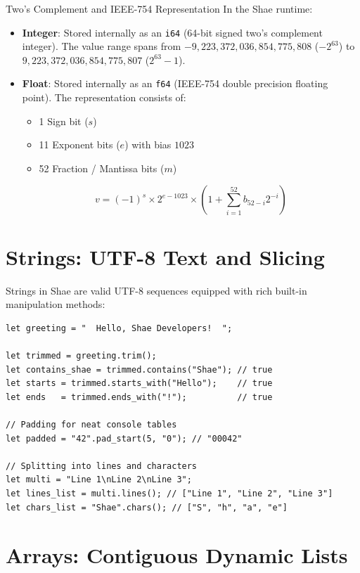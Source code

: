 \begin{deepbox}{Two's Complement and IEEE-754 Representation}
In the Shae runtime:
\begin{itemize}
    \item \textbf{Integer}: Stored internally as an \texttt{i64} (64-bit signed two's complement integer). The value range spans from $-9,223,372,036,854,775,808$ ($-2^{63}$) to $9,223,372,036,854,775,807$ ($2^{63}-1$).
    \item \textbf{Float}: Stored internally as an \texttt{f64} (IEEE-754 double precision floating point). The representation consists of:
    \begin{itemize}
        \item 1 Sign bit ($s$)
        \item 11 Exponent bits ($e$) with bias $1023$
        \item 52 Fraction / Mantissa bits ($m$)
    \end{itemize}
    \begin{equation}
    v = (-1)^s \times 2^{e - 1023} \times \left(1 + \sum_{i=1}^{52} b_{52-i} 2^{-i}\right)
    \end{equation}
\end{itemize}
\end{deepbox}

\section{Strings: UTF-8 Text and Slicing}

Strings in Shae are valid UTF-8 sequences equipped with rich built-in manipulation methods:

\begin{lstlisting}[language=shaelang]
let greeting = "  Hello, Shae Developers!  ";

let trimmed = greeting.trim();
let contains_shae = trimmed.contains("Shae"); // true
let starts = trimmed.starts_with("Hello");    // true
let ends   = trimmed.ends_with("!");          // true

// Padding for neat console tables
let padded = "42".pad_start(5, "0"); // "00042"

// Splitting into lines and characters
let multi = "Line 1\nLine 2\nLine 3";
let lines_list = multi.lines(); // ["Line 1", "Line 2", "Line 3"]
let chars_list = "Shae".chars(); // ["S", "h", "a", "e"]
\end{lstlisting}

\section{Arrays: Contiguous Dynamic Lists}


